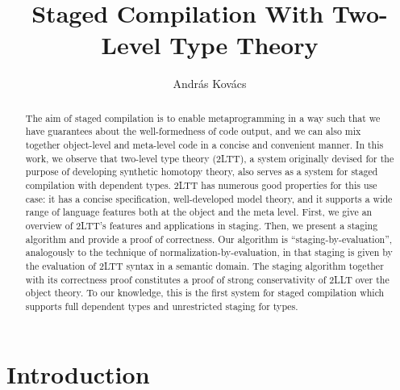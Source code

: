 \documentclass[acmsmall]{acmart}
\theoremstyle{remark}
\begin{document}
\title{Staged Compilation With Two-Level Type Theory}

\author{András Kovács}

\begin{abstract}
  The aim of staged compilation is to enable metaprogramming in a way such that
  we have guarantees about the well-formedness of code output, and we can also
  mix together object-level and meta-level code in a concise and convenient
  manner. In this work, we observe that two-level type theory (2LTT), a system
  originally devised for the purpose of developing synthetic homotopy theory,
  also serves as a system for staged compilation with dependent types. 2LTT has
  numerous good properties for this use case: it has a concise specification,
  well-developed model theory, and it supports a wide range of language features
  both at the object and the meta level. First, we give an overview of 2LTT's
  features and applications in staging. Then, we present a staging algorithm and
  provide a proof of correctness. Our algorithm is ``staging-by-evaluation'',
  analogously to the technique of normalization-by-evaluation, in that staging
  is given by the evaluation of 2LTT syntax in a semantic domain. The staging
  algorithm together with its correctness proof constitutes a proof of strong
  conservativity of 2LLT over the object theory. To our knowledge, this is the
  first system for staged compilation which supports full dependent types and
  unrestricted staging for types.
\end{abstract}

\begin{CCSXML}
\end{CCSXML}

\maketitle

\section{Introduction}\label{sec:introduction}
\end{document}
